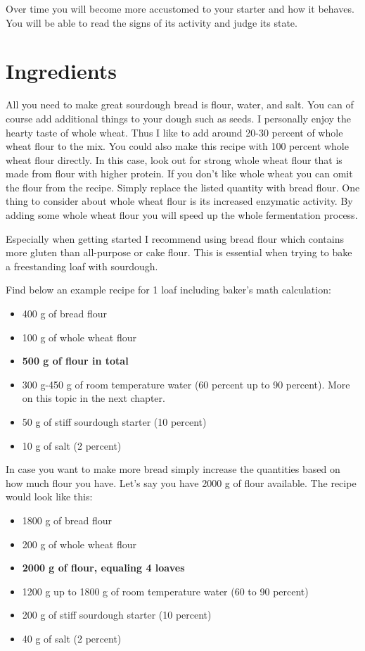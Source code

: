 Over time you will become more accustomed to your starter
and how it behaves. You will be able to read the signs of its
activity and judge its state.

\section{Ingredients}

All you need to make great sourdough bread is flour, water, and salt. You
can of course add additional things to your dough such as seeds. I personally
enjoy the hearty taste of whole wheat. Thus I like to add around 20-30 percent
of whole wheat flour to the mix. You could also make this recipe with 100 percent
whole wheat flour directly. In this case, look out for strong whole wheat
flour that is made from flour with higher protein. If you don't like whole
wheat you can omit the flour from the recipe. Simply replace the listed
quantity with bread flour. One thing to consider about whole wheat
flour is its increased enzymatic activity. By adding some whole wheat
flour you will speed up the whole fermentation process.

Especially when getting started I recommend using bread flour which
contains more gluten than all-purpose or cake flour. This is essential
when trying to bake a freestanding loaf with sourdough.

Find below an example recipe for 1 loaf including baker's math calculation:

\begin{itemize}
  \item 400 g of bread flour
  \item 100 g of whole wheat flour
  \item \textbf{500 g of flour in total}
  \item 300 g-450 g of room temperature water (60 percent up to 90 percent). More on
this topic in the next chapter.
  \item 50 g of stiff sourdough starter (10 percent)
  \item 10 g of salt (2 percent)
\end{itemize}

In case you want to make more bread simply increase the quantities based on
how much flour you have. Let's say you have 2000 g of flour available. The
recipe would look like this:

\begin{itemize}
  \item 1800 g of bread flour
  \item 200 g of whole wheat flour
  \item \textbf{2000 g of flour, equaling 4 loaves}
  \item 1200 g up to 1800 g of room temperature water (60 to 90 percent)
  \item 200 g of stiff sourdough starter (10 percent)
  \item 40 g of salt (2 percent)
\end{itemize}


